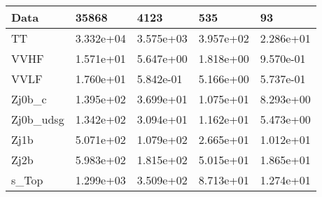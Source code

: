 \begin{table}
{\begin{tabularx}{\textwidth}{|X|X|X|X|X|}
\hline
Data & 35868 & 4123 & 535 & 93 \\
\hline
TT & 3.332e+04 & 3.575e+03 & 3.957e+02 & 2.286e+01 \\
VVHF & 1.571e+01 & 5.647e+00 & 1.818e+00 & 9.570e-01 \\
VVLF & 1.760e+01 & 5.842e-01 & 5.166e+00 & 5.737e-01 \\
Zj0b\_c & 1.395e+02 & 3.699e+01 & 1.075e+01 & 8.293e+00 \\
Zj0b\_udsg & 1.342e+02 & 3.094e+01 & 1.162e+01 & 5.473e+00 \\
Zj1b & 5.071e+02 & 1.079e+02 & 2.665e+01 & 1.012e+01 \\
Zj2b & 5.983e+02 & 1.815e+02 & 5.015e+01 & 1.865e+01 \\
s\_Top & 1.299e+03 & 3.509e+02 & 8.713e+01 & 1.274e+01 \\
\hline
\end{tabularx}
}
\label{tab:cr-Zmm-2018}
\end{table}

